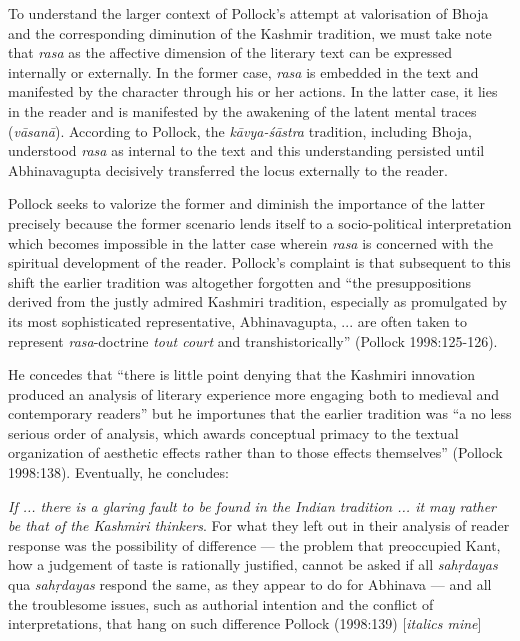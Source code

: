 To understand the larger context of Pollock's attempt at valorisation of Bhoja and the corresponding diminution of the Kashmir tradition, we must take note that \textsl{rasa} as the affective dimension of the literary text can be expressed internally or externally. In the former case, \textsl{rasa} is embedded in the text and manifested by the character through his or her actions. In the latter case, it lies in the reader and is manifested by the awakening of the latent mental traces (\textsl{vāsanā}). According to Pollock, the \textsl{kāvya-śāstra} tradition, including Bhoja, understood \textsl{rasa} as internal to the text and this understanding persisted until Abhinavagupta decisively transferred the locus externally to the reader. 

Pollock seeks to valorize the former and diminish the importance of the latter precisely because the former scenario lends itself to a socio-political interpretation which becomes impossible in the latter case wherein \textsl{rasa} is concerned with the spiritual development of the reader. Pollock's complaint is that subsequent to this shift the earlier tradition was altogether forgotten and ``the presuppositions derived from the justly admired Kashmiri tradition, especially as promulgated by its most sophisticated representative, Abhinavagupta, ... are often taken to represent \textsl{rasa}-doctrine \textsl{tout court} and transhistorically'' (Pollock 1998:125-126). 

He concedes that ``there is little point denying that the Kashmiri innovation produced an analysis of literary experience more engaging both to medieval and contemporary readers'' but he importunes that the earlier tradition was ``a no less serious order of analysis, which awards conceptual primacy to the textual organization of aesthetic effects rather than to those effects themselves'' (Pollock 1998:138). Eventually, he concludes:

\smallskip

\begin{myquote}
{\textsl{If ... there is a glaring fault to be found in the Indian tradition ... it may rather be that of the Kashmiri thinkers}}. For what they left out in their analysis of reader response was the possibility of difference --- the problem that preoccupied Kant, how a judgement of taste is rationally justified, cannot be asked if all \textsl{sahṛdayas} qua \textsl{sahṛdayas} respond the same, as they appear to do for Abhinava --- and all the troublesome issues, such as authorial intention and the conflict of interpretations, that hang on such difference 
\hfill Pollock (1998:139) [\textsl{italics mine}]
\end{myquote}

